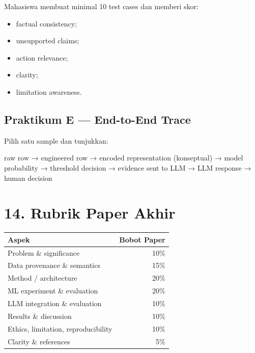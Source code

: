 \documentclass[
  indonesian,
  letterpaper,
  DIV=11,
  numbers=noendperiod]{scrreprt}
\newenvironment{Shaded}{\begin{snugshade}}{\end{snugshade}}
\newcommand{\NormalTok}[1]{\textcolor[rgb]{0.00,0.23,0.31}{#1}}
\newcounter{none} %
\providecommand{\tightlist}{%
  \setlength{\itemsep}{0pt}\setlength{\parskip}{0pt}}
\begin{document}
Mahasiswa membuat minimal 10 test cases dan memberi skor:

\begin{itemize}
\tightlist
\item
  factual consistency;
\item
  unsupported claims;
\item
  action relevance;
\item
  clarity;
\item
  limitation awareness.
\end{itemize}

\section{Praktikum E --- End-to-End
Trace}\label{praktikum-e-end-to-end-trace}

Pilih satu sample dan tunjukkan:

\begin{Shaded}
\begin{Highlighting}[]
\NormalTok{raw row}
\NormalTok{→ engineered row}
\NormalTok{→ encoded representation (konseptual)}
\NormalTok{→ model probability}
\NormalTok{→ threshold decision}
\NormalTok{→ evidence sent to LLM}
\NormalTok{→ LLM response}
\NormalTok{→ human decision}
\end{Highlighting}
\end{Shaded}


\chapter{14. Rubrik Paper Akhir}\label{rubrik-paper-akhir}

{\def\LTcaptype{none} %
\begin{longtable}[]{@{}lr@{}}
\toprule\noalign{}
Aspek & Bobot Paper \\
\midrule\noalign{}
\endhead
\bottomrule\noalign{}
\endlastfoot
Problem \& significance & 10\% \\
Data provenance \& semantics & 15\% \\
Method / architecture & 20\% \\
ML experiment \& evaluation & 20\% \\
LLM integration \& evaluation & 10\% \\
Results \& discussion & 10\% \\
Ethics, limitation, reproducibility & 10\% \\
Clarity \& references & 5\% \\
\end{longtable}
}
\end{document}
